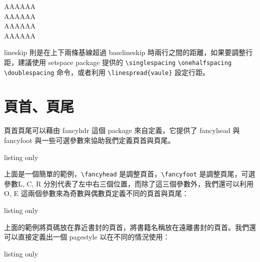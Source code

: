 \linespread{1}\selectfont
\begin{tcolorbox}
{\setlength{\baselineskip}{12pt}\selectfont
AAAAAA\\
AAAAAA\\}
{\setlength{\baselineskip}{24pt}\selectfont
AAAAAA\\
AAAAAA\\}
\end{tcolorbox}
\linespread{1.5}\selectfont

lineskip 則是在上下兩條基線超過 baselineskip 時兩行之間的距離，如果要調整行距，建議使用 setspace package 提供的 \verb|\singlespacing| \verb|\onehalfspacing| \verb|\doublespacing| 命令，或者利用 \verb|\linespread{vaule}| 設定行距。

\section{頁首、頁尾}

頁首頁尾可以藉由 fancyhdr 這個 package 來自定義，它提供了 fancyhead 與fancyfoot 與一些可選參數來協助我們定義頁首與頁尾。

\begin{tcblisting}{listing only}
\usepackage{fancyhdr}
\pagestyle{fancy}
\fancyhead[L,C,R]{ }%
\fancyfoot[L,C,R]{ }
\fancyhead[R]{\thepage}%
\renewcommand{\headrulewidth}{0.4pt}%
\end{tcblisting}

上面是一個簡單的範例，\verb|\fancyhead| 是調整頁首，\verb|\fancyfoot| 是調整頁尾，可選參數L, C, R 分別代表了左中右三個位置，而除了這三個參數外，我們還可以利用 O, E 這兩個參數來為奇數與偶數頁定義不同的頁首與頁尾：

\begin{tcblisting}{listing only}
\pagestyle{fancy}
\fancyhead[L,C,R]{ }%
\fancyfoot[L,C,R]{ }
\fancyhead[RO,LE]{\thepage}
\renewcommand{\headrulewidth}{0.4pt}%
\end{tcblisting}

上面的範例將頁碼放在靠近書封的頁首，將書籍名稱放在遠離書封的頁首。我們還可以直接定義出一個 pagestyle 以在不同的情況使用：

\begin{tcblisting}{listing only}
\pagestyle{name}%
\end{tcblisting}

